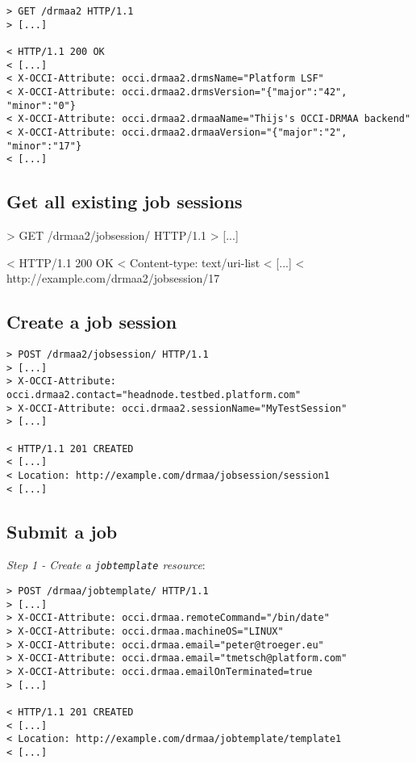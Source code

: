 \documentclass[10pt]{article}
\newcommand{\h}[1]{\lstinline|#1|}
\begin{document}
\begin{verbatim}
> GET /drmaa2 HTTP/1.1
> [...]

< HTTP/1.1 200 OK 
< [...]
< X-OCCI-Attribute: occi.drmaa2.drmsName="Platform LSF"
< X-OCCI-Attribute: occi.drmaa2.drmsVersion="{"major":"42", "minor":"0"} 
< X-OCCI-Attribute: occi.drmaa2.drmaaName="Thijs's OCCI-DRMAA backend"
< X-OCCI-Attribute: occi.drmaa2.drmaaVersion="{"major":"2", "minor":"17"} 
< [...]
\end{verbatim}

\subsection{Get all existing job sessions}

> GET /drmaa2/jobsession/ HTTP/1.1
> [...]

< HTTP/1.1 200 OK 
< Content-type: text/uri-list
< [...]
< http://example.com/drmaa2/jobsession/17


\subsection{Create a job session}

\begin{verbatim}
> POST /drmaa2/jobsession/ HTTP/1.1
> [...]
> X-OCCI-Attribute: occi.drmaa2.contact="headnode.testbed.platform.com"
> X-OCCI-Attribute: occi.drmaa2.sessionName="MyTestSession"
> [...]

< HTTP/1.1 201 CREATED 
< [...] 
< Location: http://example.com/drmaa/jobsession/session1
< [...]
\end{verbatim}

\subsection{Submit a job}

\emph{Step 1 - Create a \h{jobtemplate} resource}:

\begin{verbatim}
> POST /drmaa/jobtemplate/ HTTP/1.1
> [...]
> X-OCCI-Attribute: occi.drmaa.remoteCommand="/bin/date"
> X-OCCI-Attribute: occi.drmaa.machineOS="LINUX"
> X-OCCI-Attribute: occi.drmaa.email="peter@troeger.eu"
> X-OCCI-Attribute: occi.drmaa.email="tmetsch@platform.com"
> X-OCCI-Attribute: occi.drmaa.emailOnTerminated=true
> [...]

< HTTP/1.1 201 CREATED 
< [...] 
< Location: http://example.com/drmaa/jobtemplate/template1
< [...]
\end{verbatim}
\end{document}
